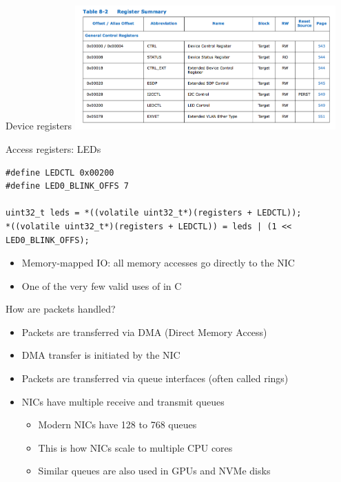 \documentclass[NET,english,aspectratio=169]{tumbeamer}
\begin{document}
\begin{frame}{Device registers}
\centering\includegraphics[width=0.75\textwidth]{pics/registers}
\end{frame}

\begin{frame}[fragile=singleslide]{Access registers: LEDs}
\begin{verbatim}
#define LEDCTL 0x00200
#define LED0_BLINK_OFFS 7

uint32_t leds = *((volatile uint32_t*)(registers + LEDCTL));
*((volatile uint32_t*)(registers + LEDCTL)) = leds | (1 << LED0_BLINK_OFFS);
\end{verbatim}
\begin{itemize}
\item Memory-mapped IO: all memory accesses go directly to the NIC
\item One of the very few valid uses of  in C
\end{itemize}
\end{frame}

\begin{frame}[fragile=singleslide]{How are packets handled?}
\begin{itemize}
\item Packets are transferred via DMA (Direct Memory Access)
\item DMA transfer is initiated by the NIC
\vspace{1em}
\item Packets are transferred via queue interfaces (often called rings)
\item NICs have multiple receive and transmit queues
\begin{itemize}
\item Modern NICs have 128 to 768 queues
\item This is how NICs scale to multiple CPU cores
\item Similar queues are also used in GPUs and NVMe disks
\end{itemize}
\end{itemize}
\end{frame}
\end{document}
